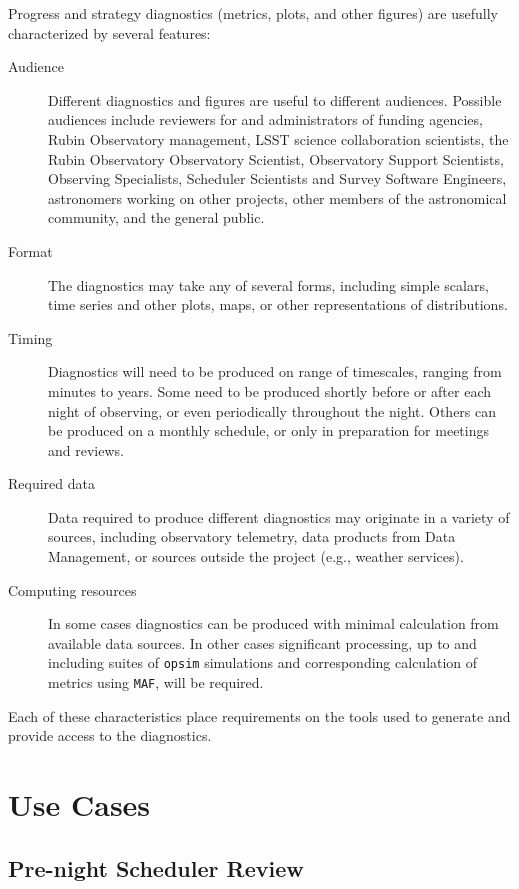 Progress and strategy diagnostics (metrics, plots, and other figures) are usefully characterized by several features:
\begin{description}
\item[{Audience}] Different diagnostics and figures are useful to different audiences. Possible audiences include reviewers for and administrators of funding agencies, Rubin Observatory management, LSST science collaboration scientists, the Rubin Observatory Observatory Scientist, Observatory Support Scientists, Observing Specialists, Scheduler Scientists and Survey Software Engineers, astronomers working on other projects, other members of the astronomical community, and the general public.
\item[{Format}] The diagnostics may take any of several forms, including simple scalars, time series and other plots, maps, or other representations of distributions.
\item[{Timing}] Diagnostics will need to be produced on range of timescales, ranging from minutes to years. Some need to be produced shortly before or after each night of observing, or even periodically throughout the night. Others can be produced on a monthly schedule, or only in preparation for meetings and reviews.
\item[{Required data}] Data required to produce different diagnostics may originate in a variety of sources, including observatory telemetry, data products from Data Management, or sources outside the project (e.g., weather services).
\item[{Computing resources}] In some cases diagnostics can be produced with minimal calculation from available data sources. In other cases significant processing, up to and including suites of \texttt{opsim} simulations and corresponding calculation of metrics using \texttt{MAF}, will be required.
\end{description}

Each of these characteristics place requirements on the tools used to generate and provide access to the diagnostics.

\section{Use Cases}
\label{sec:org5fcf0ed}
\subsection{Pre-night Scheduler Review}
\label{sec:org054e3f5}

